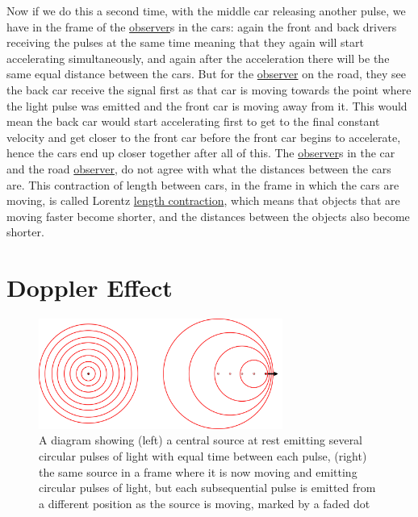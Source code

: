 Now if we do this a second time, with the middle car releasing another pulse, we have in the frame of the \hyperlink{def-observer}{observer}s in the cars: again the front and back drivers receiving the pulses at the same time meaning that they again will start accelerating simultaneously, and again after the acceleration there will be the same equal distance between the cars. But for the \hyperlink{def-observer}{observer} on the road, they see the back car receive the signal first as that car is moving towards the point where the light pulse was emitted and the front car is moving away from it. This would mean the back car would start accelerating first to get to the final constant velocity and get closer to the front car before the front car begins to accelerate, hence the cars end up closer together after all of this. The \hyperlink{def-observer}{observer}s in the car and the road \hyperlink{def-observer}{observer}, do not agree with what the distances between the cars are. This contraction of length between cars, in the frame in which the cars are moving, is called Lorentz \hyperlink{def-length-contraction}{length contraction}, which means that objects that are moving faster become shorter, and the distances between the objects also become shorter.

\section{Doppler Effect}

\begin{figure}[H]
	\centering
	\includegraphics[width=8cm]{images/pdf/Doppler.pdf}
	\caption{A diagram showing (left) a central source at rest emitting several circular pulses of light with equal time between each pulse, (right) the same source in a frame where it is now moving and emitting circular pulses of light, but each subsequential pulse is emitted from a different position as the source is moving, marked by a faded dot}
	\label{fig: doppler effect intro}
\end{figure}

